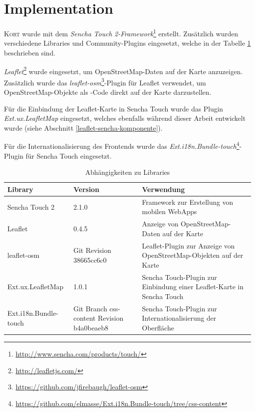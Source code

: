 \section{Implementation}

\textsc{Kort} wurde mit dem \emph{Sencha Touch 2-Framework}\footnote{\url{http://www.sencha.com/products/touch/}} erstellt. Zusätzlich wurden verschiedene Libraries und Community-Plugins eingesetzt, welche in der Tabelle \ref{table-kort-dependencies} beschrieben sind. 

\emph{Leaflet}\footnote{\url{http://leafletjs.com/}} wurde eingesetzt, um \gls{OpenStreetMap}-Daten auf der Karte anzuzeigen. Zusätzlich wurde das \emph{leaflet-osm}\footnote{\url{https://github.com/jfirebaugh/leaflet-osm}}-Plugin für Leaflet verwendet, um \gls{OpenStreetMap}-Objekte als -Code direkt auf der Karte darzustellen.

Für die Einbindung der Leaflet-Karte in Sencha Touch wurde das Plugin \emph{Ext.ux.LeafletMap} eingesetzt, welches ebenfalls während dieser Arbeit entwickelt wurde (siehe Abschnitt \ref{leaflet-sencha-komponente}).

Für die Internationalisierung des Frontends wurde das \emph{Ext.i18n.Bundle-touch}\footnote{\url{https://github.com/elmasse/Ext.i18n.Bundle-touch/tree/css-content}}-Plugin für Sencha Touch eingesetzt.

\begin{table}[H]
\centering
\begin{tabular}{|p{0.25\threecelltabwidth}|p{0.15\threecelltabwidth}|p{0.60\threecelltabwidth}|}
\hline 
\textbf{Library} & \textbf{Version} & \textbf{Verwendung} \\
\hline 
Sencha Touch 2 & 2.1.0 & Framework zur Erstellung von mobilen \glspl{WebApp} \\
\hline 
Leaflet & 0.4.5 & Anzeige von \gls{OpenStreetMap}-Daten auf der Karte \\
\hline 
leaflet-osm & Git Revision 38665cc6c0 & Leaflet-Plugin zur Anzeige von \gls{OpenStreetMap}-Objekten auf der Karte \\
\hline 
Ext.ux.LeafletMap & 1.0.1 & Sencha Touch-Plugin zur Einbindung einer Leaflet-Karte in Sencha Touch \\
\hline 
Ext.i18n.Bundle-touch & Git Branch css-content Revision 
b4a0beaeb8 & Sencha Touch-Plugin zur Internationalisierung der Oberfläche \\
\hline 
\end{tabular}
\caption{Abhängigkeiten zu Libraries}
\label{table-kort-dependencies}
\end{table}

